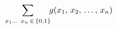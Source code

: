\documentclass[preview]{standalone}
\begin{document}
\begin{align*}
\special{dvisvgm:raw <g id='unique000'>}\sum_{x_1\ldots\ x_n\,\in\,\{0,1\}}\!\! g(x_1,\,x_2,\,\ldots,\,x_n)\special{dvisvgm:raw </g>}
\end{align*}
\end{document}
